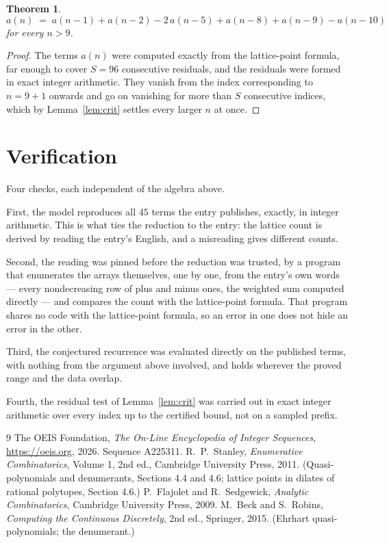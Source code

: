 \documentclass[11pt,a4paper]{article}
\theoremstyle{plain}
\newtheorem{theorem}{Theorem}
\theoremstyle{definition}
\begin{document}
\begin{theorem}
\[
a(n)\;=\;a(n-1) + a(n-2) - 2\,a(n-5) + a(n-8) + a(n-9) - a(n-10)
\]
for every $n>9$.
\end{theorem}

\begin{proof}
The terms $a(n)$ were computed exactly from the lattice-point formula, far enough to cover
$S=96$ consecutive residuals, and the residuals were formed in exact integer arithmetic.
They vanish from the index corresponding to $n=9+1$ onwards and go on vanishing for more
than $S$ consecutive indices, which by Lemma~\ref{lem:crit} settles every larger $n$ at
once.
\end{proof}

\section{Verification}

Four checks, each independent of the algebra above.

First, the model reproduces all $45$ terms the entry publishes, exactly, in integer
arithmetic. This is what ties the reduction to the entry: the lattice count is derived by reading the
entry's English, and a misreading gives different counts.

Second, the reading was pinned before the reduction was trusted, by a program that enumerates
the arrays themselves, one by one, from the entry's own words --- every nondecreasing
row of plus and minus ones, the weighted sum computed directly --- and compares the count
with the lattice-point formula. That program shares no code with the lattice-point formula, so an error in one does not
hide an error in the other.

Third, the conjectured recurrence was evaluated directly on the published terms, with
nothing from the argument above involved, and holds wherever the proved range and the data
overlap.

Fourth, the residual test of Lemma~\ref{lem:crit} was carried out in exact integer
arithmetic over every index up to the certified bound, not on a sampled prefix.

\begin{thebibliography}{9}
 The OEIS Foundation, \emph{The On-Line Encyclopedia of Integer
Sequences}, \url{https://oeis.org}, 2026. Sequence A225311.
 R.~P.~Stanley, \emph{Enumerative Combinatorics}, Volume 1, 2nd ed.,
Cambridge University Press, 2011. (Quasi-polynomials and denumerants, Sections 4.4 and 4.6;
lattice points in dilates of rational polytopes, Section 4.6.)
 P.~Flajolet and R.~Sedgewick, \emph{Analytic Combinatorics}, Cambridge
University Press, 2009.
 M.~Beck and S.~Robins, \emph{Computing the Continuous Discretely}, 2nd
ed., Springer, 2015. (Ehrhart quasi-polynomials; the denumerant.)
\end{thebibliography}
\end{document}
